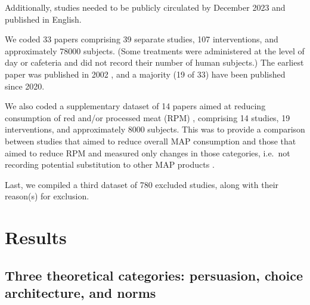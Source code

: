 \documentclass[sn-nature,pdflatex]{sn-jnl}
\begin{document}
Additionally, studies needed to be publicly circulated by December 2023
and published in English.

We coded 33 papers
\citep{abrahamse2007, alblas2023, aldoh2023, allen2002, andersson2021, acharya2004, berndsen2005, bertolaso2015, bianchi2022, bochmann2017, bschaden2020, carfora2023, coker2022, cooney2016, fehrenbach2015, feltz2022, griesoph2021, haile2021, hatami2018, hennessy2016, jalil2023, lacroix2020, mathur2021effectiveness, mattson2020, merrill2009, norris2014, peacock2017, piester2020, polanco2022, sparkman2017, sparkman2020, sparkman2021, weingarten2022}
comprising 39 separate studies, 107 interventions, and approximately
78000 subjects. (Some treatments were administered at the level of day
or cafeteria and did not record their number of human subjects.) The
earliest paper was published in 2002 \citep{allen2002}, and a majority
(19 of 33) have been published since 2020.

We also coded a supplementary dataset of 14 papers aimed at reducing
consumption of red and/or processed meat (RPM)
\citep{carfora2017correlational, carfora2017randomised, carfora2019, carfora2019informational, delichatsios2001, dijkstra2022, emmons2005cancer, emmons2005project, jaacks2014, james2015, lee2018, perino2022, schatzkin2000, sorensen2005},
comprising 14 studies, 19 interventions, and approximately 8000
subjects. This was to provide a comparison between studies that aimed to
reduce overall MAP consumption and those that aimed to reduce RPM and
measured only changes in those categories, i.e.~not recording potential
substitution to other MAP products \citep{mathur2022ethical}.

Last, we compiled a third dataset of 780 excluded studies, along with
their reason(s) for exclusion.

\section{Results}\label{sec2}

\subsection{Three theoretical categories: persuasion, choice
architecture, and norms}\label{sec2.1}
\end{document}
